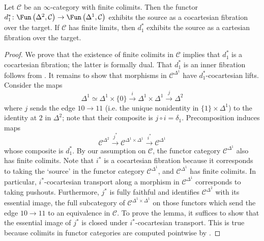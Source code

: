 \begin{lemma}\label{lemma:restriction_functor_cat_as_fibrations}
    Let $ \mathcal{C} $ be an $ \infty $-category with finite colimits. 
    Then the functor $ d_1^* \colon \Fun\left(\Delta^2, \mathcal{C}\right) \to \Fun\left(\Delta^1, \mathcal{C}\right) $ exhibits the source as a cocartesian fibration over the target. 
    If $ \mathcal{C} $ has finite limits, then $ d_1^* $ exhibits the source as a cartesian fibration over the target. 
\end{lemma}
\begin{proof}
    We prove that the existence of finite colimits in $ \mathcal{C} $ implies that $ d_1^* $ is a cocartesian fibration; the latter is formally dual. 
    That $ d_1^*$ is an inner fibration follows from \cite[Corollary 2.3.2.5]{HTT}. 
    It remains to show that morphisms in $ \mathcal{C}^{\Delta^1} $ have $ d_1^*$-cocartesian lifts. 
    Consider the maps 
    \begin{equation*}
        \Delta^1 \simeq \Delta^1 \times \{0\} \xrightarrow{i} \Delta^1 \times \Delta^1 \xrightarrow{j} \Delta^2
    \end{equation*}
    where $ j $ sends the edge $ 10 \to 11 $ (i.e. the unique nonidentity in $ \{1\} \times \Delta^1 $) to the identity at $ 2 $ in $ \Delta^2 $; note that their composite is $ j \circ i = \delta_1 $. 
    Precomposition induces maps 
    \begin{equation*}
        \mathcal{C}^{\Delta^2} \xrightarrow{j^*} \mathcal{C}^{\Delta^1 \times \Delta^1} \xrightarrow{i^*} \mathcal{C}^{\Delta^1}
    \end{equation*}  
    whose composite is $ d_1^* $. 
    By our assumption on $ \mathcal{C} $, the functor category $ \mathcal{C}^{\Delta^1} $ also has finite colimits. 
    Note that $ i^* $ is a cocartesian fibration because it corresponds to taking the `source' in the functor category $ \mathcal{C}^{\Delta^1} $, and $ \mathcal{C}^{\Delta^1} $ has finite colimits. 
    In particular, $ i^* $-cocartesian transport along a morphism in $ \mathcal{C}^{\Delta^1} $ corresponds to taking pushouts. 
    Furthermore, $ j^* $ is fully faithful and identifies $ \mathcal{C}^{\Delta^2} $ with its essential image, the full subcategory of $ \mathcal{C}^{\Delta^1 \times \Delta^1} $ on those functors which send the edge $ 10 \to 11 $ to an equivalence in $ \mathcal{C} $. 
    To prove the lemma, it suffices to show that the essential image of $ j^* $ is closed under $ i^* $-cocartesian transport. 
    This is true because colimits in functor categories are computed pointwise by \cite[Corollary 5.1.2.3]{HTT}.  
\end{proof}

